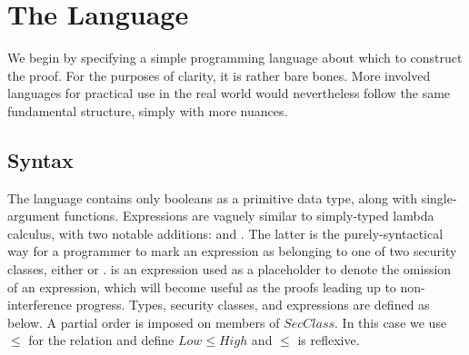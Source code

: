 \documentclass[12pt]{report}
\begin{document}
\section{The Language}



We begin by specifying a simple programming language about which to
construct the proof. For the purposes of clarity, it is rather bare
bones. More involved languages for practical use in the real world
would nevertheless follow the same fundamental structure, simply with
more nuances.

\subsection{Syntax}



The language contains only booleans as a primitive data type, along
with single-argument functions. Expressions are vaguely similar to
simply-typed lambda calculus, with two notable additions:
 and . The latter is the
purely-syntactical way for a programmer to mark an expression as
belonging to one of two security classes, either  or
.  is an expression used as
a placeholder to denote the omission of an expression, which will
become useful as the proofs leading up to non-interference progress.
Types, security classes, and expressions are defined as below.
A partial order is imposed on members of $SecClass$. In this case we
use $\leq$ for the relation and define $Low\leq High$ and $\leq$ is
reflexive.




\end{document}
